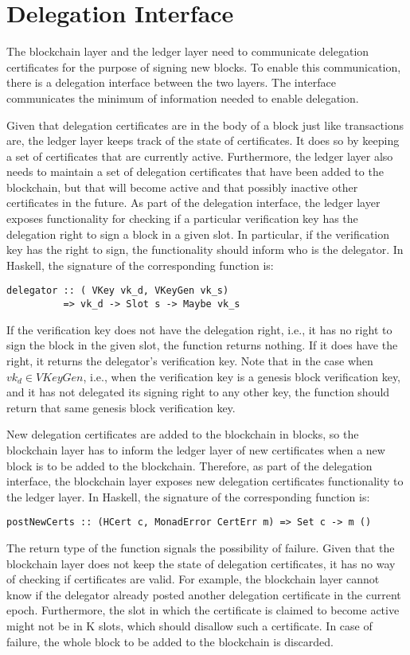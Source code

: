 \documentclass[11pt,a4paper]{article}
\begin{document}
\section{Delegation Interface}
\label{sec:del-interface}

The blockchain layer and the ledger layer need to communicate delegation
certificates for the purpose of signing new blocks.
%
To enable this communication, there is a delegation interface between the two
layers.
%
The interface communicates the minimum of information needed to enable
delegation.


Given that delegation certificates are in the body of a block just like
transactions are, the ledger layer keeps track of the state of certificates.
%
It does so by keeping a set of certificates that are currently active.
%
Furthermore, the ledger layer also needs to maintain a set of delegation
certificates that have been added to the blockchain, but that will become
active and that possibly inactive other certificates in the future.
%
As part of the delegation interface, the ledger layer exposes functionality
for checking if a particular verification key has the delegation right to sign
a block in a given slot.
%
In particular, if the verification key has the right to sign, the
functionality should inform who is the delegator.
%
In Haskell, the signature of the corresponding function is:
%
\begin{lstlisting}
delegator :: ( VKey vk_d, VKeyGen vk_s)
          => vk_d -> Slot s -> Maybe vk_s
\end{lstlisting}

If the verification key does not have the delegation right, i.e., it has no
right to sign the block in the given slot, the function returns nothing.
%
If it does have the right, it returns the delegator's verification key.
%
Note that in the case when $vk_d \in VKeyGen$, i.e., when the verification key
is a genesis block verification key, and it has not delegated its signing
right to any other key, the function should return that same genesis block
verification key.


New delegation certificates are added to the blockchain in blocks, so the
blockchain layer has to inform the ledger layer of new certificates when a new
block is to be added to the blockchain.
%
Therefore, as part of the delegation interface, the blockchain layer exposes
new delegation certificates functionality to the ledger layer.
%
In Haskell, the signature of the corresponding function is:
%
\begin{lstlisting}
postNewCerts :: (HCert c, MonadError CertErr m) => Set c -> m ()
\end{lstlisting}
%
The return type of the function signals the possibility of failure.
%
Given that the blockchain layer does not keep the state of delegation
certificates, it has no way of checking if certificates are valid.
%
For example, the blockchain layer cannot know if the delegator already posted
another delegation certificate in the current epoch.
%
Furthermore, the slot in which the certificate is claimed to become active
might not be in K slots, which should disallow such a certificate.
%
In case of failure, the whole block to be added to the blockchain is
discarded.
\end{document}
